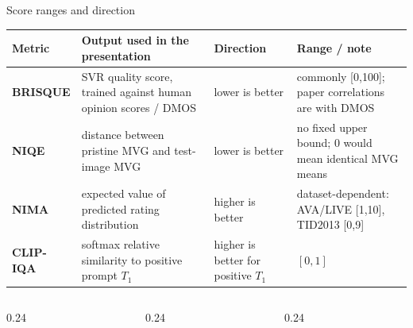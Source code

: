 \documentclass[aspectratio=169,10pt]{beamer}
\begin{document}
\begin{frame}{Score ranges and direction}
\vspace{-0.35em}
\begin{center}
\scriptsize
\renewcommand{\arraystretch}{1.28}
\begin{tabular}{>{\bfseries}p{}p{}p{}p{}}
\toprule
Metric & Output used in the presentation & Direction & Range / note \\
\midrule
BRISQUE & SVR quality score, trained against human opinion scores / DMOS & lower is better & commonly [0,100]; paper correlations are with DMOS \\
NIQE & distance between pristine MVG and test-image MVG & lower is better & no fixed upper bound; 0 would mean identical MVG means \\
NIMA & expected value of predicted rating distribution & higher is better & dataset-dependent: AVA/LIVE [1,10], TID2013 [0,9] \\
CLIP-IQA & softmax relative similarity to positive prompt \(T_1\) & higher is better for positive \(T_1\) & \([0,1]\) \\
\bottomrule
\end{tabular}
\end{center}
\vspace{0.35em}
\begin{columns}[T,onlytextwidth]
  \begin{column}{0.24\textwidth}
  \end{column}
  \begin{column}{0.24\textwidth}
  \end{column}
  \begin{column}{0.24\textwidth}

\end{column}
\end{columns}
\end{frame}
\end{document}
